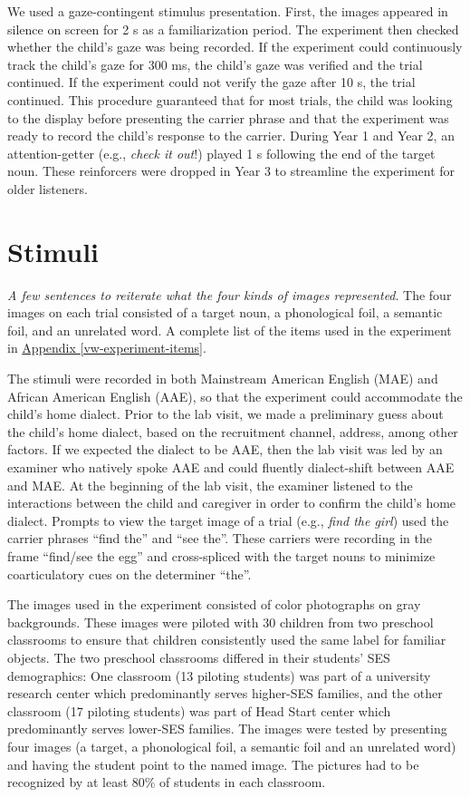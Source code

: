\documentclass [11pt, proquest] {uwthesis}[2015/03/03]
\begin{document}
We used a gaze-contingent stimulus presentation. First, the images
appeared in silence on screen for 2 s as a familiarization period. The
experiment then checked whether the child's gaze was being recorded. If
the experiment could continuously track the child's gaze for 300 ms, the
child's gaze was verified and the trial continued. If the experiment
could not verify the gaze after 10 s, the trial continued. This
procedure guaranteed that for most trials, the child was looking to the
display before presenting the carrier phrase and that the experiment was
ready to record the child's response to the carrier. During Year 1 and
Year 2, an attention-getter (e.g., \emph{check it out}!) played 1 s
following the end of the target noun. These reinforcers were dropped in
Year 3 to streamline the experiment for older listeners.

\section{Stimuli}\label{stimuli}

\emph{A few sentences to reiterate what the four kinds of images
represented}. The four images on each trial consisted of a target noun,
a phonological foil, a semantic foil, and an unrelated word. A complete
list of the items used in the experiment in
\protect\hyperlink{vw-experiment-items}{Appendix
\ref{vw-experiment-items}}.

The stimuli were recorded in both Mainstream American English (MAE) and
African American English (AAE), so that the experiment could accommodate
the child's home dialect. Prior to the lab visit, we made a preliminary
guess about the child's home dialect, based on the recruitment channel,
address, among other factors. If we expected the dialect to be AAE, then
the lab visit was led by an examiner who natively spoke AAE and could
fluently dialect-shift between AAE and MAE. At the beginning of the lab
visit, the examiner listened to the interactions between the child and
caregiver in order to confirm the child's home dialect. Prompts to view
the target image of a trial (e.g., \emph{find the girl}) used the
carrier phrases ``find the'' and ``see the''. These carriers were
recording in the frame ``find/see the egg'' and cross-spliced with the
target nouns to minimize coarticulatory cues on the determiner ``the''.

The images used in the experiment consisted of color photographs on gray
backgrounds. These images were piloted with 30 children from two
preschool classrooms to ensure that children consistently used the same
label for familiar objects. The two preschool classrooms differed in
their students' SES demographics: One classroom (13 piloting students)
was part of a university research center which predominantly serves
higher-SES families, and the other classroom (17 piloting students) was
part of Head Start center which predominantly serves lower-SES families.
The images were tested by presenting four images (a target, a
phonological foil, a semantic foil and an unrelated word) and having the
student point to the named image. The pictures had to be recognized by
at least 80\% of students in each classroom.
\end{document}
